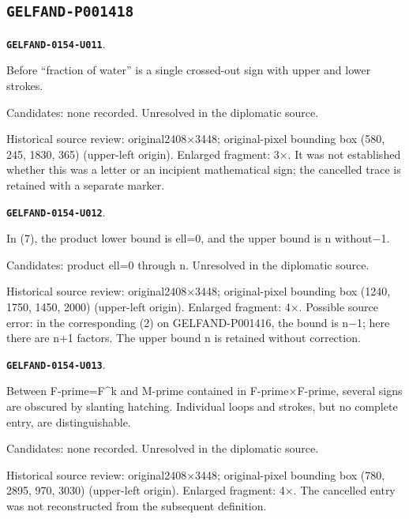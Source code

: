 \documentclass[11pt]{article}
\theoremstyle{definition}
\theoremstyle{remark}
\begin{document}
\subsection*{\texttt{GELFAND-P001418}}
\par\noindent\leavevmode{}\label{GELFAND-0154-U011}\label{GELFAND-P001418:basin-cancelled-sign:note}\textbf{\texttt{GELFAND-0154-U011}}.\nopagebreak[4]\par
Before “fraction of water” is a single crossed-out sign with upper and lower strokes.\par
Candidates: none recorded. Unresolved in the diplomatic source.\par
Historical source review: original2408×3448; original-pixel bounding box (580, 245, 1830, 365) (upper-left origin). Enlarged fragment: 3×. It was not established whether this was a letter or an incipient mathematical sign; the cancelled trace is retained with a separate marker.\par\medskip
\par\noindent\leavevmode{}\label{GELFAND-0154-U012}\label{GELFAND-P001418:eq7-upper-product-bound:note}\textbf{\texttt{GELFAND-0154-U012}}.\nopagebreak[4]\par
In (7), the product lower bound is ell=0, and the upper bound is n without−1.\par
Candidates: product ell=0 through n. Unresolved in the diplomatic source.\par
Historical source review: original2408×3448; original-pixel bounding box (1240, 1750, 1450, 2000) (upper-left origin). Enlarged fragment: 4×. Possible source error: in the corresponding (2) on GELFAND-P001416, the bound is n−1; here there are n+1 factors. The upper bound n is retained without correction.\par\medskip
\par\noindent\leavevmode{}\label{GELFAND-0154-U013}\label{GELFAND-P001418:before-m-prime-cancelled:note}\textbf{\texttt{GELFAND-0154-U013}}.\nopagebreak[4]\par
Between F-prime=F\textasciicircum{}k and M-prime contained in F-prime×F-prime, several signs are obscured by slanting hatching. Individual loops and strokes, but no complete entry, are distinguishable.\par
Candidates: none recorded. Unresolved in the diplomatic source.\par
Historical source review: original2408×3448; original-pixel bounding box (780, 2895, 970, 3030) (upper-left origin). Enlarged fragment: 4×. The cancelled entry was not reconstructed from the subsequent definition.\par\medskip
\end{document}
